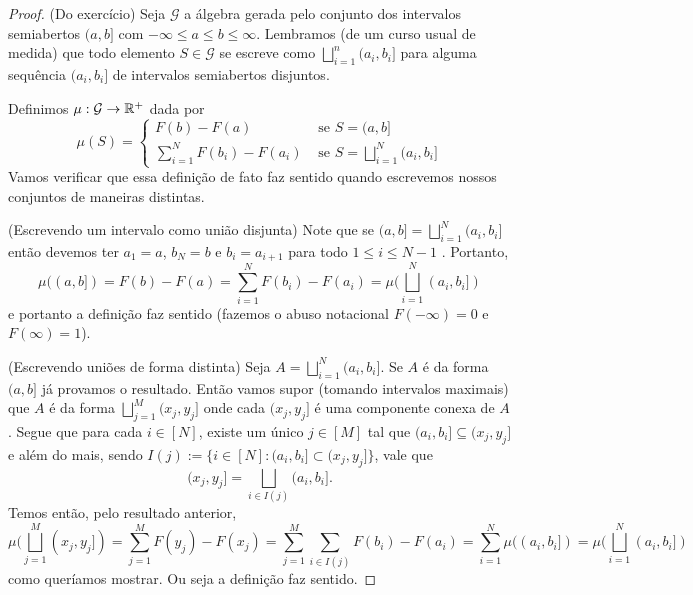 \begin{proof}
	(Do exercício)
	Seja $\mathcal{G}$ a álgebra gerada pelo conjunto dos intervalos
	semiabertos $(a,b]$ com
	$-\infty \leq a \leq b \leq \infty$. Lembramos (de um curso usual de
	medida) que todo elemento $S \in \mathcal{G}$
	se escreve como $\bigsqcup_{i = 1}^n (a_i,b_i]$ para alguma
	sequência $(a_i,b_i]$ de intervalos semiabertos disjuntos.

	Definimos $\mu: \mathcal{G} \rightarrow \mathbb{R}^+$ dada por
	\[
		\mu(S) =
		\begin{cases}
			F(b) - F(a) & \text{ se } S = (a,b]\\
			\sum_{i = 1}^{N} F(b_i) - F(a_i) & \text{ se } S =
			\bigsqcup_{i=1}^{N} (a_i,b_i]
		\end{cases}
	\]
	Vamos verificar que essa definição de fato faz sentido quando escrevemos nossos
	conjuntos de maneiras distintas.

	(Escrevendo um intervalo como união disjunta) Note que se $(a,b] =
	\bigsqcup_{i=1}^N
	(a_i,b_i]$ então devemos ter $a_1 = a$, $b_N = b$ e
	$b_i = a_{i+1}$ para todo $1 \leq i \leq N-1$ . Portanto,
	\[
		\mu((a,b]) = F(b) - F(a) = \sum_{i = 1}^{N} F(b_i) - F(a_i) =
		\mu(\bigsqcup_{i=1}^{N} (a_i,b_i])
	\]
	e portanto a definição faz sentido (fazemos o abuso notacional
	$F(-\infty) = 0$ e $F(\infty) = 1$).

	(Escrevendo uniões de forma distinta) Seja $A = \bigsqcup_{i=1}^{N}
	(a_i,b_i]$. Se $A$ é da forma $(a,b]$ já provamos
	o resultado. Então vamos supor (tomando intervalos maximais)
	que $A$ é da forma $\bigsqcup_{j = 1}^M (x_j, y_j]$ onde cada $(x_j,
	y_j]$ é uma componente conexa de $A$.
	Segue que para cada $i \in [N]$, existe um único $j \in [M]$ tal que
	$(a_i,b_i] \subseteq (x_j,y_j]$ e
	além do mais, sendo $I(j) := \{i \in [N] : (a_i,b_i] \subset (x_j,
	y_j]\}$, vale que
	\[
		(x_j,y_j] = \bigsqcup_{i\in I(j)} (a_i,b_i].
	\]
	Temos então, pelo resultado anterior,
	\[
		\mu(\bigsqcup_{j = 1}^M (x_j, y_j]) = \sum_{j = 1}^{M} F(y_j) - F(x_j) =
		\sum_{j=1}^{M} \sum_{i \in I(j)} F(b_i) - F(a_i) = \sum_{i = 1}^N
		\mu((a_i,b_i]) = \mu(\bigsqcup_{i=1}^N (a_i,b_i])
	\]
	como queríamos mostrar. Ou seja a definição faz sentido.


\end{proof}

